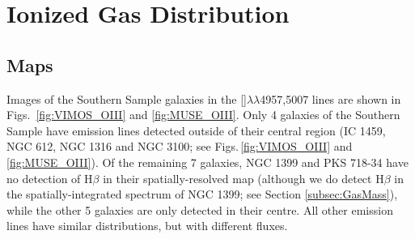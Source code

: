\section{Ionized Gas Distribution}
	\label{sec:GasFlux}

	\subsection{Maps}
		\label{subsec:GasMaps}
		Images of the Southern Sample galaxies in the []$\lambda\lambda$4957,5007 lines are shown in Figs.\ \ref{fig:VIMOS_OIII} and \ref{fig:MUSE_OIII}. Only 4 galaxies of the Southern Sample have emission lines detected outside of their central region (IC 1459, NGC 612, NGC 1316 and NGC 3100; see Figs.\,\ref{fig:VIMOS_OIII} and \ref{fig:MUSE_OIII}). Of the remaining 7 galaxies, NGC 1399 and PKS 718-34 have no detection of H$\beta$ in their spatially-resolved map (although we do detect H$\beta$ in the spatially-integrated spectrum of NGC 1399; see Section \ref{subsec:GasMass}), while the other 5 galaxies are only detected in their centre. All other emission lines have similar distributions, but with different fluxes.%


